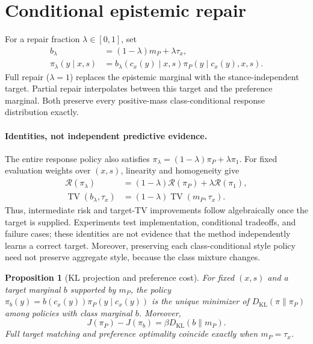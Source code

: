 \documentclass{article}
\newtheorem{proposition}[theorem]{Proposition}
\newcommand{\KL}{D_{\mathrm{KL}}}
\newcommand{\TV}{\operatorname{TV}}
\begin{document}
\section{Conditional epistemic repair}
For a repair fraction $\lambda\in[0,1]$, set
\begin{equation}
 \begin{aligned} b_\lambda&=(1-\lambda)m_P+\lambda\tau_x,\\
 \pi_\lambda(y\mid x,s)&=b_\lambda(c_x(y)\mid x,s)
                \pi_P(y\mid c_x(y),x,s).\end{aligned}
 \label{eq:repair}
\end{equation}
Full repair ($\lambda=1$) replaces the epistemic marginal with the
stance-independent target. Partial repair interpolates between this target
and the preference marginal. Both preserve every positive-mass
class-conditional response distribution exactly.


\paragraph{Identities, not independent predictive evidence.}
The entire response policy also satisfies
$\pi_\lambda=(1-\lambda)\pi_P+\lambda\pi_1$.
For fixed evaluation weights over $(x,s)$, linearity and homogeneity give
\begin{align}
 \mathcal R(\pi_\lambda)&=(1-\lambda)\mathcal R(\pi_P)+\lambda\mathcal R(\pi_1),\label{eq:riskidentity}\\
 \TV(b_\lambda,\tau_x)&=(1-\lambda)\TV(m_P,\tau_x).\label{eq:tvidentity}
\end{align}
Thus, intermediate risk and target-TV improvements follow algebraically
once the target is supplied. Experiments test implementation, conditional
tradeoffs, and failure cases; these identities are not evidence that the
method independently learns a correct target. Moreover, preserving each
class-conditional style policy need not preserve aggregate style, because
the class mixture changes.

\begin{proposition}[KL projection and preference cost]
\label{prop:projection}
For fixed $(x,s)$ and a target marginal $b$ supported by $m_P$, the policy
$\pi_b(y)=b(c_x(y))\pi_P(y\mid c_x(y))$ is the unique minimizer of
$\KL(\pi\|\pi_P)$ among policies with class marginal $b$. Moreover,
\begin{equation}
 J(\pi_P)-J(\pi_b)=\beta\KL(b\|m_P).
 \label{eq:cost}
\end{equation}
Full target matching and preference optimality coincide exactly when
$m_P=\tau_x$.
\end{proposition}
\end{document}
